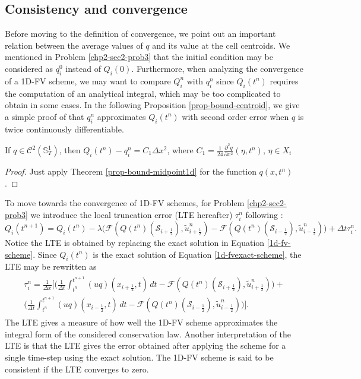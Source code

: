 \subsection{Consistency and convergence}
\label{chp2-sub-CC}
Before moving to the definition of convergence, we point out an important relation
between the average values of $q$ and its value at the cell centroids.
We mentioned in Problem \ref{chp2-sec2-prob3} that the initial condition may be considered as $q_i^0$
instead of $Q_i(0)$. 
Furthermore, when analyzing the convergence of a 1D-FV scheme, we may 
want to compare $Q_i^n$ with $q_i^n$ since $Q_i(t^n)$ requires the computation of 
an analytical integral, which may be too complicated to obtain in some cases.
In the following Proposition \ref{prop-bound-centroid}, we give a simple proof
of that $q_i^n$ approximates $Q_i(t^n)$ with second order error when $q$ is twice
continuously differentiable.
\begin{prop}
	\label{prop-bound-centroid}
	If $q \in \mathcal{C}^2(\mathbb{S}_{T}^1)$, then $Q_i(t^n)-q_i^n = C_1 \Delta x^2$, where 
	$C_1 = \frac{1}{24}\frac{\partial^2 q}{\partial x^2} (\eta, t^n)$,  $\eta \in X_i$
\end{prop}
\begin{proof}
	Just apply Theorem \ref{prop-bound-midpoint1d} for the function $q(x,t^n)$.	
\end{proof}
To move towards the convergence of 1D-FV schemes, for  Problem \ref{chp2-sec2-prob3} we introduce the local truncation error (LTE hereafter)
$\tau_i^n$ following \citet{leveque:2002}:
\begin{equation}
	\label{consistency-1d-eq1}
	Q_i(t^{n+1}) = Q_i(t^n) - \lambda
	\bigg(\mathcal{F}(Q(t^n)(\mathcal{S}_{i+\frac{1}{2}}),\tilde{u}^n_{i+\frac{1}{2}})-
	\mathcal{F}(Q(t^n)(\mathcal{S}_{i-\frac{1}{2}}),\tilde{u}^n_{i-\frac{1}{2}}) \bigg) + \Delta t \tau_i^n.
\end{equation}
Notice the LTE is obtained by replacing the exact solution in Equation \eqref{1d-fv-scheme}.
Since $Q_i(t^n)$ is the exact solution of Equation \eqref{1d-fvexact-scheme}, 
the LTE may be rewritten as
\begin{align}
	\begin{split}
	\label{consistency-1d-eq2}
		\tau_{i}^n = 
		\frac{1}{\Delta x} \bigg[  \bigg( \frac{1}{\Delta t}\int_{t^{n}}^{t^{n+1}}
		{(uq)}(x_{i+\frac{1}{2}}, t) \,dt - \mathcal{F}(Q(t^n)(\mathcal{S}_{i+\frac{1}{2}} ),\tilde{u}^n_{i+\frac{1}{2}}) \bigg) +\\
		\bigg( \frac{1}{\Delta t}\int_{t^{n}}^{t^{n+1}}
		{(uq)}(x_{i-\frac{1}{2}}, t) \,dt - \mathcal{F}(Q(t^n)(\mathcal{S}_{i-\frac{1}{2}} ),\tilde{u}^n_{i-\frac{1}{2}}) \bigg)
		\bigg].
	\end{split}
\end{align}
The LTE gives a measure of how well the 1D-FV scheme approximates the integral form
of the considered conservation law. 
Another interpretation of the LTE is that the LTE gives the error obtained after applying
the scheme for a single time-step using the exact solution.
The 1D-FV scheme is said to be consistent
if the LTE converges to zero.

